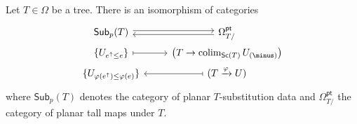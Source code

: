 \documentclass[a4paper,10pt]{article}%
\begin{document}
\begin{proposition}\label{SUBDATAUNDERPLAN PROP}
  Let $T \in \Omega$ be a tree. There is an isomorphism of categories
  \begin{equation}\label{SUBDATAUNDERPLAN EQ}
    \begin{tikzcd}[row sep =0pt]
      \mathsf{Sub}_p(T) \ar[r,shift left=2pt] &
      \Omega_{T/}^{\mathsf{pt}} \ar[l,shift left=2pt]
      \\
      \{U_{e^{\uparrow} \leq e}\} \ar[r,mapsto] & 
      \left(T \to \colim_{\mathsf{Sc}(T)} U_{(\minus)}\right)
      \\
      \{U_{\varphi(e^{\uparrow}) \leq \varphi(e)}\} &
      (T \xrightarrow{\varphi} U) \ar[l,mapsto]
    \end{tikzcd}
  \end{equation}
  where $\mathsf{Sub}_p(T)$ denotes the category of planar $T$-substitution data and $\Omega_{T/}^{\mathsf{pt}}$
  the category of planar tall maps under $T$. 
\end{proposition}
\end{document}
